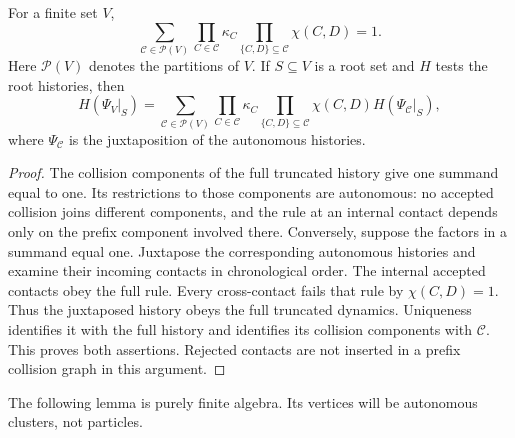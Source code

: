 \begin{lemma}\label{lem:autonomous-partition}
For a finite set $V$,
\begin{equation}\label{eq:autonomous-partition}
 \sum_{\mathcal C\in\mathcal P(V)}
 \prod_{C\in\mathcal C}\kappa_C
 \prod_{\{C,D\}\subseteq\mathcal C}\chi(C,D)=1.
\end{equation}
Here $\mathcal P(V)$ denotes the partitions of $V$.  If $S\subseteq V$ is a
root set and $H$ tests the root histories, then
\begin{equation}\label{eq:autonomous-observation}
 H(\Psi_V|_S)=
 \sum_{\mathcal C\in\mathcal P(V)}
 \prod_{C\in\mathcal C}\kappa_C
 \prod_{\{C,D\}\subseteq\mathcal C}\chi(C,D)
 H(\Psi_{\mathcal C}|_S),
\end{equation}
where $\Psi_{\mathcal C}$ is the juxtaposition of the autonomous histories.
\end{lemma}

\begin{proof}
The collision components of the full truncated history give one summand
equal to one.  Its restrictions to those components are autonomous:
no accepted collision joins different components, and the rule at an
internal contact depends only on the prefix component involved there.
Conversely, suppose the factors in a summand equal one.  Juxtapose the
corresponding autonomous histories and examine their incoming contacts in
chronological order.  The internal accepted contacts obey the full rule.
Every cross-contact fails that rule by $\chi(C,D)=1$.  Thus the juxtaposed
history obeys the full truncated dynamics.  Uniqueness identifies it with
the full history and identifies its collision components with
$\mathcal C$.  This proves both assertions.  Rejected contacts are not
inserted in a prefix collision graph in this argument.
\end{proof}

The following lemma is purely finite algebra.  Its vertices will be
autonomous clusters, not particles.

